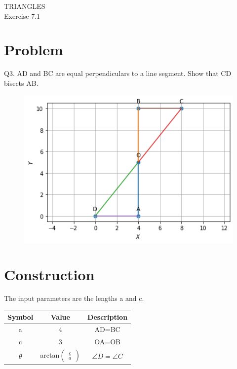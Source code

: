 \documentclass[10pt,a4paper]{article}
\title{\mytitle}
\newcommand{\myvec}[1]{\ensuremath{\begin{pmatrix}#1\end{pmatrix}}}
\begin{document}
\begin{center}
\textbf\large{TRIANGLES}\\
\textbf\large{Exercise 7.1}
\end{center}

\tableofcontents
\section{Problem}
Q3. AD and BC are equal perpendiculars to a line segment. Show that CD bisects AB.
\begin{figure}[!h]
	\begin{center}
		\includegraphics[width=5in]{./figs/figure.png}
	\end{center}
\caption{}
\label{figure}
\end{figure}
\pagebreak
\section{Construction}
The input parameters are the lengths a and c.\\
{
\setlength\extrarowheight{2pt}
\begin{tabular}{|c|c|c|}
	\hline
	\textbf{Symbol}&\textbf{Value}&\textbf{Description}\\
	\hline
	a&4&AD=BC\\
	\hline
	c&3&OA=OB\\
	\hline
	$\theta$&arctan$\myvec{\frac{c}{a}}$&$\angle{D}=\angle{C}$\\
	\hline
\end{tabular}
}
\end{document}
